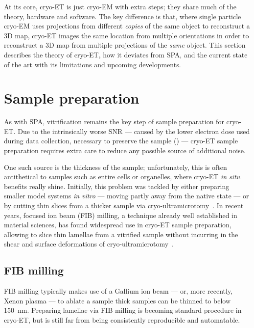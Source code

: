 At its core, cryo-ET is just cryo-EM with extra steps; they share much of the theory, hardware and software.
The key difference is that, where single particle cryo-EM uses projections from different \textit{copies} of the same object to reconstruct a 3D map, cryo-ET images the same location from multiple orientations in order to reconstruct a 3D map from multiple projections of the \textit{same} object.
This section describes the theory of cryo-ET, how it deviates from SPA, and the current state of the art with its limitations and upcoming developments.

\localtableofcontents

\section{Sample preparation}
As with SPA, vitrification remains the key step of sample preparation for cryo-ET.
Due to the intrinsically worse SNR --- caused by the lower electron dose used during data collection, necessary to preserve the sample () --- cryo-ET sample preparation requires extra care to reduce any possible source of additional noise.

One such source is the thickness of the sample; unfortunately, this is often antithetical to samples such as entire cells or organelles, where cryo-ET \textit{in situ} benefits really shine.
Initially, this problem was tackled by either preparing smaller model systems \textit{in vitro} --- moving partly away from the native state --- or by cutting thin slices from a thicker sample via cryo-ultramicrotomy~\cite{peaseElectronMicroscopyUltramicrotomy1981}.
In recent years, focused ion beam (FIB) milling, a technique already well established in material sciences, has found widespread use in cryo-ET sample preparation, allowing to slice thin lamellae from a vitrified sample without incurring in the shear and surface deformations of cryo-ultramicrotomy~\cite{markoFocusedionbeamThinningFrozenhydrated2007}.

\subsection{FIB milling}
FIB milling typically makes use of a Gallium ion beam --- or, more recently, Xenon plasma --- to ablate a sample
thick samples can be thinned to below \qty{150}{\nano\meter}.
Preparing lamellae via FIB milling is becoming standard procedure in cryo-ET, but is still far from being consistently reproducible and automatable.

